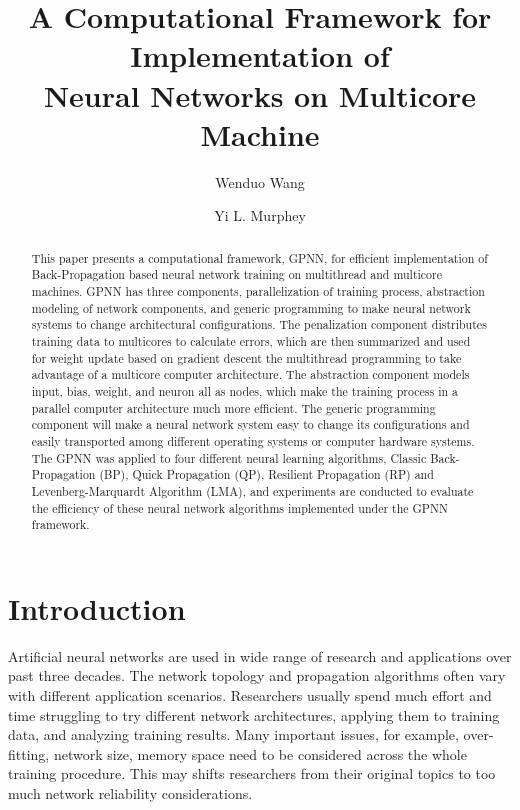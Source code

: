 \documentclass[procedia]{easychair}
\title{A Computational Framework for Implementation of\\
       Neural Networks on Multicore Machine}
\author{
    Wenduo Wang\inst{1}%
\and
    Yi L. Murphey\inst{2}%
}
\institute{
  University of Michigan-Dearborn,
  Dearborn, Michigan, U.S.A\\
  \email{wenduow@umich.edu}
\and
   University of Michigan-Dearborn,
   Dearborn, Michigan, U.S.A\\
   \email{yilu@umich.edu}\\
}
\begin{document}
\maketitle


\begin{abstract}

This paper presents a computational framework, GPNN, for efficient implementation of Back-Propagation based neural network training on multithread and multicore machines. GPNN has three components, parallelization of training process, abstraction modeling of network components, and generic programming to make neural network systems to change architectural configurations.  The penalization component distributes training data to multicores to calculate errors, which are then summarized and used for weight update based on gradient descent the multithread programming to take advantage of a multicore computer architecture.  The abstraction component models input, bias, weight, and neuron all as nodes, which make the training process in a parallel computer architecture much more efficient.  The generic programming component will make a neural network system easy to change its configurations and easily transported among different operating systems or computer hardware systems.  The GPNN was applied to four different neural learning algorithms, Classic Back-Propagation (BP), Quick Propagation (QP), Resilient Propagation (RP) and Levenberg-Marquardt Algorithm (LMA), and experiments are conducted to evaluate the efficiency of these neural network algorithms implemented under the GPNN framework.

\end{abstract}


\section{Introduction}

Artificial neural networks are used in wide range of research and applications over past three decades.  The network topology and propagation algorithms often vary with different application scenarios.  Researchers usually spend much effort and time struggling to try different network architectures, applying them to training data, and analyzing training results.  Many important issues, for example, over-fitting, network size, memory space need to be considered across the whole training procedure.  This may shifts researchers from their original topics to too much network reliability considerations.
\end{document}
